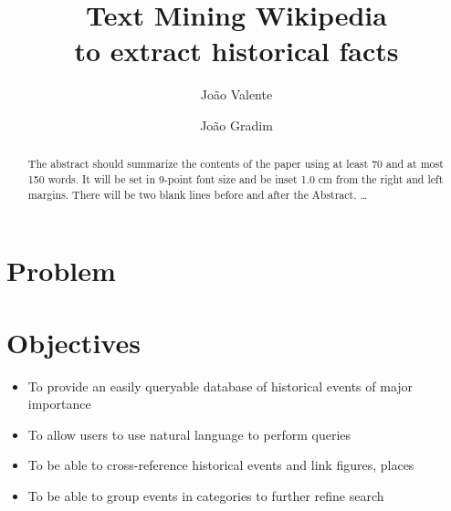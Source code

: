 \documentclass{llncs}
\begin{document}
\mainmatter              %
%
\title{Text Mining Wikipedia\\to extract historical facts}
%
%
\author{João Valente \and João Gradim}
%
%
%

\maketitle              %

\begin{abstract}
The abstract should summarize the contents of the paper
using at least 70 and at most 150 words. It will be set in 9-point
font size and be inset 1.0 cm from the right and left margins.
There will be two blank lines before and after the Abstract. \dots
\end{abstract}

\section{Problem}

\section{Objectives}

\begin{itemize}
	\item To provide an easily queryable database of historical events of major importance
	\item To allow users to use natural language to perform queries
	\item To be able to cross-reference historical events and link figures, places
	\item To be able to group events in categories to further refine search
\end{itemize}
\end{document}

